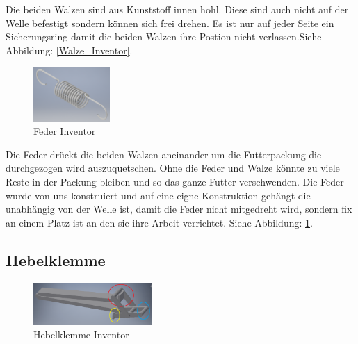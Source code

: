 Die beiden Walzen sind aus Kunststoff innen hohl. Diese sind auch nicht auf der Welle befestigt sondern können sich frei drehen. Es ist nur auf jeder Seite ein Sicherungsring damit die beiden Walzen ihre Postion nicht verlassen.Siehe Abbildung: \ref{Walze_Inventor}. \\

\begin{figure}
\vspace{-20pt}
  \begin{center}
    \includegraphics[width=0.26\textwidth]{Bilder/Inventor/Feder}
  \end{center}
  \caption{Feder Inventor}
  \label{Feder_Inventor}
  \vspace{-20pt}
\end{figure}

Die Feder drückt die beiden Walzen aneinander um die Futterpackung die durchgezogen wird auszuquetschen. Ohne die Feder und Walze könnte zu viele Reste in der Packung bleiben und so das ganze Futter verschwenden. Die Feder wurde von uns konstruiert und auf eine eigne Konstruktion gehängt die unabhängig von der Welle ist, damit die Feder nicht mitgedreht wird, sondern fix an einem Platz ist an den sie ihre Arbeit verrichtet. Siehe Abbildung: \ref{Feder_Inventor}.

\subsection{Hebelklemme}

\begin{figure}
\vspace{-20pt}
  \begin{center}
    \includegraphics[width=0.40\textwidth]{Bilder/Inventor/Hebel_Klemme}
  \end{center}
  \caption{Hebelklemme Inventor}
  \label{Hebel_Klemme_Inventor}
  \vspace{-10pt}
\end{figure}

